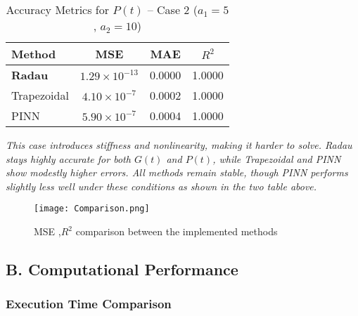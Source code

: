 \documentclass[journal]{IEEEtran}
\begin{document}
\begin{table}[h!]
\centering
\caption{Accuracy Metrics for $P(t)$ – Case 2 ($a_1 = 5$, $a_2 = 10$)}
\label{tab:case2_P}
\begin{tabular}{|l|c|c|c|}
\hline
\textbf{Method} & \textbf{MSE} & \textbf{MAE} & \textbf{$R^2$} \\
\hline
\textbf{Radau}        & $1.29\times10^{-13}$ & 0.0000 & 1.0000 \\
Trapezoidal  & $4.10\times10^{-7}$  & 0.0002 & 1.0000 \\
PINN         & $5.90\times10^{-7}$  & 0.0004 & 1.0000 \\
\hline
\end{tabular}
\end{table}
\textit{This case introduces stiffness and nonlinearity, making it harder to solve. Radau stays highly accurate for both $G(t)$ and $P(t)$, while Trapezoidal and PINN show modestly higher errors. All methods remain stable, though PINN performs slightly less well under these conditions as shown in the two table above.}


\begin{figure}[H]%
\begin {center}
\texttt{[image: Comparison.png]}
\caption{ MSE ,$R^2$ comparison between the implemented methods }
\label{fig:ecg}
\end {center}
\end{figure}

\subsection*{B. Computational Performance}

\subsubsection*{ Execution Time Comparison}
\end{document}
